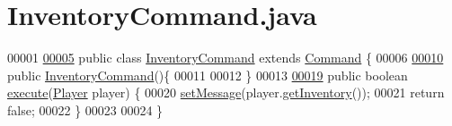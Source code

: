 \hypertarget{InventoryCommand_8java_source}{\section{Inventory\-Command.\-java}
}

\begin{DoxyCode}
00001 
\hypertarget{InventoryCommand_8java_source_l00005}{}\hyperlink{classInventoryCommand}{00005} \textcolor{keyword}{public} \textcolor{keyword}{class }\hyperlink{classInventoryCommand}{InventoryCommand} \textcolor{keyword}{extends} \hyperlink{classCommand}{Command} \{
00006 
\hypertarget{InventoryCommand_8java_source_l00010}{}\hyperlink{classInventoryCommand_a8734205a1ed7afa3705737a03f234f34}{00010}     \textcolor{keyword}{public} \hyperlink{classInventoryCommand_a8734205a1ed7afa3705737a03f234f34}{InventoryCommand}()\{
00011 
00012     \}
00013 
\hypertarget{InventoryCommand_8java_source_l00019}{}\hyperlink{classInventoryCommand_a103714a9704895e9d8ddd5bcd758e5f8}{00019}     \textcolor{keyword}{public} \textcolor{keywordtype}{boolean} \hyperlink{classInventoryCommand_a103714a9704895e9d8ddd5bcd758e5f8}{execute}(\hyperlink{classPlayer}{Player} player) \{
00020         \hyperlink{classCommand_a715709d8f0ab65879d79ad1725c96f17}{setMessage}(player.\hyperlink{classPlayer_a5c4667e6eca93d1bba69f7db022f2feb}{getInventory}());
00021         \textcolor{keywordflow}{return} \textcolor{keyword}{false};
00022     \}
00023 
00024 \}
\end{DoxyCode}
